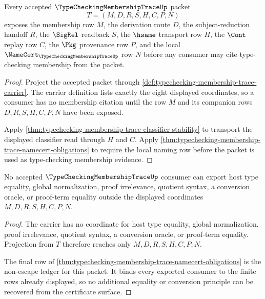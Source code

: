 \begin{theorem}
\label{thm:typechecking-membership-trace-route-coverage}
Every accepted $\TypeCheckingMembershipTraceUp$ packet
$$
T=(M,D,R,S,H,C,P,N)
$$
exposes the membership row $M$, the derivation route $D$, the subject-reduction handoff $R$, the $\SigRel$ readback $S$, the $\hsame$ transport row $H$, the $\Cont$ replay row $C$, the $\Pkg$ provenance row $P$, and the local $\NameCert_{\TypeCheckingMembershipTraceUp}$ row $N$ before any consumer may cite type-checking membership from the packet.
\end{theorem}
\begin{proof}
Project the accepted packet through \autoref{def:typechecking-membership-trace-carrier}. The carrier definition lists exactly the eight displayed coordinates, so a consumer has no membership citation until the row $M$ and its companion rows $D,R,S,H,C,P,N$ have been exposed.

Apply \autoref{thm:typechecking-membership-trace-classifier-stability} to transport the displayed classifier read through $H$ and $C$. Apply \autoref{thm:typechecking-membership-trace-namecert-obligations} to require the local naming row before the packet is used as type-checking membership evidence.
\end{proof}

\begin{theorem}
\label{thm:typechecking-membership-trace-nonescape}
No accepted $\TypeCheckingMembershipTraceUp$ consumer can export host type equality, global normalization, proof irrelevance, quotient syntax, a conversion oracle, or proof-term equality outside the displayed coordinates $M,D,R,S,H,C,P,N$.
\end{theorem}
\begin{proof}
The carrier has no coordinate for host type equality, global normalization, proof irrelevance, quotient syntax, a conversion oracle, or proof-term equality. Projection from $T$ therefore reaches only $M,D,R,S,H,C,P,N$.

The final row of \autoref{thm:typechecking-membership-trace-namecert-obligations} is the non-escape ledger for this packet. It binds every exported consumer to the finite rows already displayed, so no additional equality or conversion principle can be recovered from the certificate surface.
\end{proof}

